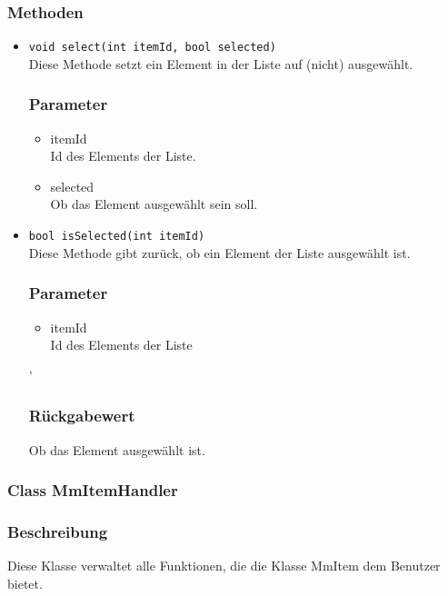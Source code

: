 \documentclass[a4paper]{scrreprt}
\begin{document}
\subsubsection*{Methoden}
\begin{addmargin}[25pt]{0pt}
\begin{itemize}

\item \texttt{void select(int itemId, bool selected)}\\
	Diese Methode setzt ein Element in der Liste auf (nicht) ausgewählt.

	\subsubsection*{Parameter}
	\begin{itemize}
	\item itemId \\
		Id des Elements der Liste.
	\item selected \\
		Ob das Element ausgewählt sein soll.
	\end{itemize}

\item \texttt{bool isSelected(int itemId)}\\
 Diese Methode gibt zurück, ob ein Element der Liste ausgewählt ist.  
	\subsubsection*{Parameter}
	\begin{itemize}
	\item itemId \\
		Id des Elements der Liste
	\end{itemize}

'   \subsubsection*{Rückgabewert}
	Ob das Element ausgewählt ist.

\end{itemize}
\end{addmargin}


\subsubsection{Class MmItemHandler}
\subsubsection*{Beschreibung}
Diese Klasse verwaltet alle Funktionen, die die Klasse MmItem dem Benutzer bietet.
\end{document}
